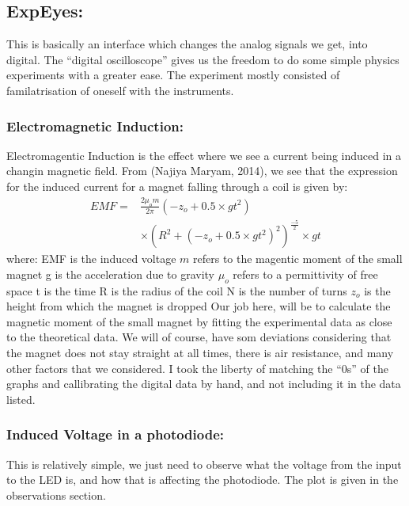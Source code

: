 \begin{Abstract:}
\subsection{ExpEyes:}
	This is basically an interface which changes the analog signals we get, into digital. The ``digital oscilloscope'' gives us the freedom to do some simple physics experiments with a greater ease. The experiment mostly consisted of familatrisation of oneself with the instruments.
\subsubsection{Electromagnetic Induction:}
	Electromagentic Induction is the effect where we see a current being induced in a changin magnetic field. From (Najiya Maryam, 2014), we see that the expression for the induced current for a magnet falling through a coil is given by:
	\begin{align}
		EMF = &\frac{2\mu_o m}{2\pi}(-z_o+0.5\times gt^2) \\ \nonumber
		&\times (R^2+(-z_o+0.5\times gt^2)^2)^\frac{-5}{2}\times gt
	\end{align}
	where:
	\newline EMF is the induced voltage
	\newline $m$ refers to the magentic moment of the small magnet
	\newline g is the acceleration due to gravity
	\newline $\mu_o$ refers to a permittivity of free space
	\newline t is the time
	\newline R is the radius of the coil
	\newline N is the number of turns
	\newline $z_o$ is the height from which the magnet is dropped
	Our job here, will be to calculate the magnetic moment of the small magnet by fitting the experimental data as close to the theoretical data. We will of course, have som deviations considering that the magnet does not stay straight at all times, there is air resistance, and many other factors that we considered. I took the liberty of matching the ``0s'' of the graphs and callibrating the digital data by hand, and not including it in the data listed.
\subsubsection{Induced Voltage in a photodiode:}
	This is relatively simple, we just need to observe what the voltage from the input to the LED is, and how that is affecting the photodiode. The plot is given in the observations section.


\end{Abstract:}
